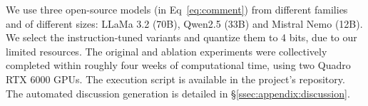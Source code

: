 We use three open-source models (in Eq~\ref{eq:comment}) from different families and of different sizes: LLaMa 3.2 (70B), Qwen2.5 (33B) and Mistral Nemo (12B). We select the instruction-tuned variants and quantize them to 4 bits, due to our limited resources. The original and ablation experiments were collectively completed within roughly four weeks of computational time, using two Quadro RTX 6000 GPUs. The execution script is available in the project's repository\analysislink. The automated discussion generation is detailed in \S\ref{ssec:appendix:discussion}.

